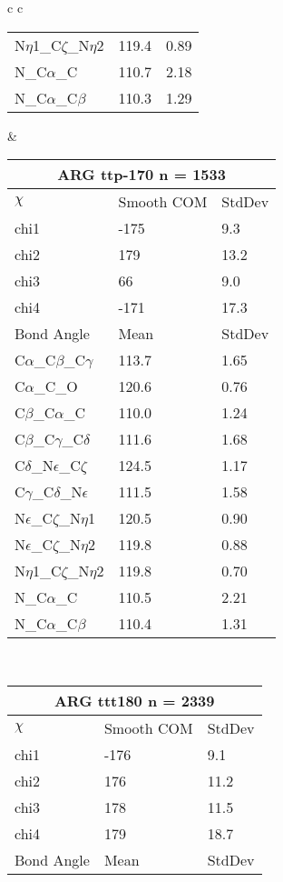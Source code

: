 \begin{longtable}{ c c }
\begin{tabular}{ l l l }
  N$\eta$1\_C$\zeta$\_N$\eta$2 & 119.4 & 0.89\\
  N\_C$\alpha$\_C & 110.7 & 2.18\\
  N\_C$\alpha$\_C$\beta$ & 110.3 & 1.29\\
  \bottomrule
  \end{tabular}
  &
  \begin{tabular}{ l l l }
  \toprule
  \multicolumn{3}{c}{ARG \textbf{ttp-170} n = 1533} \\ \toprule
  $\chi$       & Smooth COM & StdDev \\ \midrule
  chi1 & -175 & 9.3 \\ 
  chi2 & 179 & 13.2 \\ 
  chi3 & 66 & 9.0 \\ 
  chi4 & -171 & 17.3 \\ \midrule
  Bond Angle   & Mean     & StdDev \\ \midrule
  C$\alpha$\_C$\beta$\_C$\gamma$ & 113.7 & 1.65\\
  C$\alpha$\_C\_O & 120.6 & 0.76\\
  C$\beta$\_C$\alpha$\_C & 110.0 & 1.24\\
  C$\beta$\_C$\gamma$\_C$\delta$ & 111.6 & 1.68\\
  C$\delta$\_N$\epsilon$\_C$\zeta$ & 124.5 & 1.17\\
  C$\gamma$\_C$\delta$\_N$\epsilon$ & 111.5 & 1.58\\
  N$\epsilon$\_C$\zeta$\_N$\eta$1 & 120.5 & 0.90\\
  N$\epsilon$\_C$\zeta$\_N$\eta$2 & 119.8 & 0.88\\
  N$\eta$1\_C$\zeta$\_N$\eta$2 & 119.8 & 0.70\\
  N\_C$\alpha$\_C & 110.5 & 2.21\\
  N\_C$\alpha$\_C$\beta$ & 110.4 & 1.31\\
  \bottomrule
  \end{tabular}
  \\
  \begin{tabular}{ l l l }
  \toprule
  \multicolumn{3}{c}{ARG \textbf{ttt180} n = 2339} \\ \toprule
  $\chi$       & Smooth COM & StdDev \\ \midrule
  chi1 & -176 & 9.1 \\ 
  chi2 & 176 & 11.2 \\ 
  chi3 & 178 & 11.5 \\ 
  chi4 & 179 & 18.7 \\ \midrule
  Bond Angle   & Mean     & StdDev \\ \midrule

\end{tabular}
\end{longtable}
